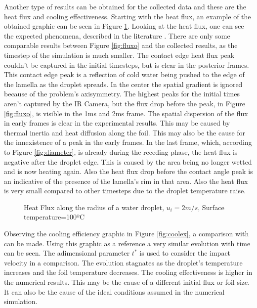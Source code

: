 \par Another type of results can be obtained for the collected data and these are the heat flux and cooling effectiveness. Starting with the heat flux, an example of the obtained graphic can be seen in Figure \ref{fig:fluex}. Looking at the heat flux, one can see the expected phenomena, described in the literature \cite{pasandideh2001cooling}. There are only some comparable results between Figure \ref{fig:fluxo} and the collected results, as the timestep of the simulation is much smaller. The contact edge heat flux peak couldn't be captured in the initial timesteps, but is clear in the posterior frames. This contact edge peak is a reflection of cold water being pushed to the edge of the lamella as the droplet spreads. In the center the spatial gradient is ignored because of the problem's axisymmetry. The highest peaks for the initial times aren't captured by the IR Camera, but the flux drop before the peak, in Figure \ref{fig:fluxo}, is visible in the 1ms and 2ms frame. The spatial dispersion of the flux in early frames is clear in the experimental results. This may be caused by thermal inertia and heat diffusion along the foil. This may also be the cause for the innexistence of a peak in the early frames. In the last frame, which, according to Figure \ref{fig:diameter}, is already during the receding phase, the heat flux is negative after the droplet edge. This is caused by the area being no longer wetted and is now heating again. Also the heat flux drop before the contact angle peak is an indicative of the presence of the lamella's rim in that area. Also the heat flux is very small compared to other timesteps due to the droplet temperature raise.\\


\begin{figure}[h!]
\centering

\caption{Heat Flux along the radius of a water droplet, $u_i=2m/s$, Surface temperature=100ºC}
\label{fig:fluex}
\end{figure}

\par Observing the cooling efficiency graphic in Figure \ref{fig:coolex}, a comparison with \cite{pasandideh2001cooling} can be made. Using this graphic as a reference a very similar evolution with time can be seen. The adimensional parameter $t^*$ is used to consider the impact velocity in a comparison. The evolution stagnates as the droplet's temperature increases and the foil temperature decreases. The cooling effectiveness is higher in the numerical results. This may be the cause of a different initial flux or foil size. It can also be the cause of the ideal conditions assumed in the numerical simulation.\\

